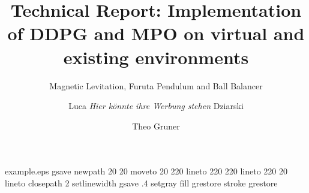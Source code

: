 %
%
%
%
%
\begin{filecontents*}{example.eps}
gsave
newpath
  20 20 moveto
  20 220 lineto
  220 220 lineto
  220 20 lineto
closepath
2 setlinewidth
gsave
  .4 setgray fill
grestore
stroke
grestore
\end{filecontents*}
%
\RequirePackage{fix-cm}
%
\documentclass[smallextended]{svjour3}       %
%
\smartqed  %
%
\usepackage{graphicx}
\usepackage{amsmath}
\usepackage{amssymb}
%
%
%
%
%


\title{Technical Report: Implementation of DDPG and MPO on virtual and existing environments%
}
\subtitle{Magnetic Levitation, Furuta Pendulum and Ball Balancer}


\author{Luca \textit{Hier k\"onnte ihre Werbung stehen} Dziarski         \and
        Theo Gruner %
}


